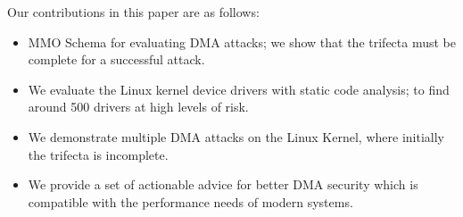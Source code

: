 Our contributions in this paper are as follows:
\begin{itemize}
    \item MMO Schema for evaluating DMA attacks; we show that the trifecta must be complete for a successful attack. 
    \item We evaluate the Linux kernel device drivers with static code analysis; to find around 500 drivers at high levels of risk.
    \item We demonstrate multiple DMA attacks on the Linux Kernel, where initially the trifecta is incomplete. 
    \item We provide a set of actionable advice for better DMA security which is compatible with the performance needs of modern systems.
\end{itemize}